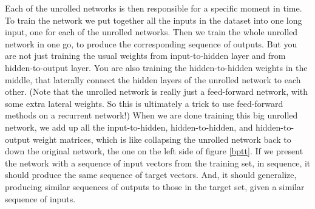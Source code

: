 Each of the unrolled networks is then responsible for a specific moment in time. To train the network we put together all the inputs in the dataset into one long input, one for each of the unrolled networks. Then we train the whole unrolled network in one go, to produce the corresponding sequence of outputs. But you are not just training the usual weights from input-to-hidden layer and from hidden-to-output layer. You are also training the hidden-to-hidden weights in the middle, that laterally connect the hidden layers  of the unrolled network to each other. (Note that the unrolled network is really just a feed-forward network, with some extra lateral weights. So this is ultimately a trick to use feed-forward methods on a recurrent network!) When we are done training this big unrolled network, we add up all the input-to-hidden, hidden-to-hidden, and hidden-to-output weight matrices, which is like collapsing the unrolled network back to down the original network, the one on the left side of figure \ref{bptt}. If we present the network with a sequence of input vectors from the training set, in sequence, it should produce the same sequence of target vectors. And, it should generalize, producing similar sequences of outputs to those in the target set, given a similar sequence of inputs. 



